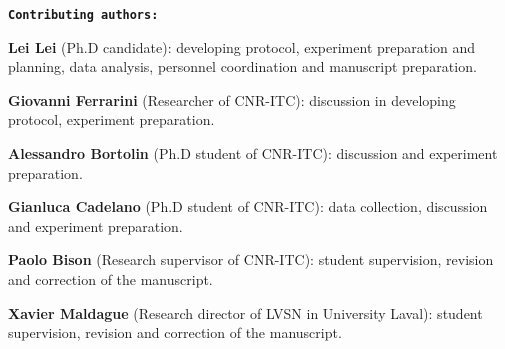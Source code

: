 \newpage
\textbf{\texttt{Contributing authors:}}

\textbf{\textsf{Lei Lei}} (Ph.D candidate): developing protocol, experiment preparation and planning, data analysis,  personnel coordination and manuscript preparation.

\textbf{Giovanni Ferrarini} (Researcher of CNR-ITC): discussion in developing protocol, experiment preparation.

\textbf{Alessandro Bortolin} (Ph.D student of CNR-ITC): discussion and experiment preparation.

\textbf{Gianluca Cadelano} (Ph.D student of CNR-ITC): data collection, discussion and experiment preparation.

\textbf{Paolo Bison} (Research supervisor of CNR-ITC): student supervision, revision and correction of the manuscript. 

\textbf{Xavier Maldague} (Research director of LVSN in University Laval): student supervision, revision and correction of the manuscript.



